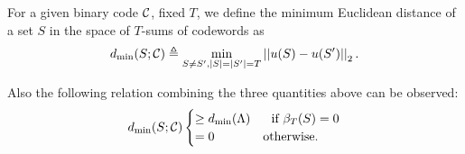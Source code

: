 \begin{definition}
For a given binary code $\mathcal{C}$, fixed $T$, we define the minimum Euclidean distance of a set $S$ in the space of  $T$-sums of codewords as
\[
d_{\mathrm{min}}(S;\mathcal{C})\triangleq \min_{S\neq S',|S|=|S'|=T} \left|\left| u(S)-u(S') \right|\right|_2.
\]
\label{Def:dmin_Tsum}
\end{definition}


Also the following relation combining the three quantities above can be observed:
\begin{equation}
d_{\mathrm{min}}(S;\mathcal{C}) \begin{cases} \geq  d_{\mathrm{min}}(\Lambda) &~~\text{if } \beta_T(S)=0 \\
=0 & \mbox{otherwise.}  \end{cases}
\label{eqn:LatticeTsumconnection}
\end{equation}


